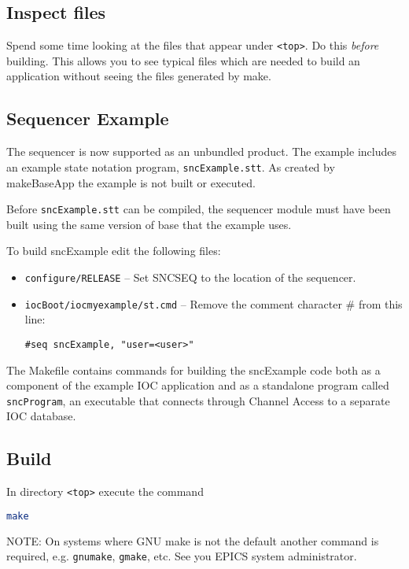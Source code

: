 \subsection{Inspect files}

Spend some time looking at the files that appear under \verb|<top>|. Do this \emph{before} building. This allows you to see typical 
files which are needed to build an application without seeing the files generated by make.

\subsection{Sequencer Example}

The sequencer is now supported as an unbundled product. The example includes an example state notation program,
\verb|sncExample.stt|. As created by makeBaseApp the example is not built or executed.

Before \verb|sncExample.stt| can be compiled, the sequencer module must have been built using the same version of base that the example uses.

To build sncExample edit the following files:

\begin{itemize}
\item \verb|configure/RELEASE| -- Set SNCSEQ to the location of the sequencer.
\item \verb|iocBoot/iocmyexample/st.cmd| -- Remove the comment character \# from this line:

\verb|#seq sncExample, "user=<user>"|
\end{itemize}

The Makefile contains commands for building the sncExample code both as a component of the example IOC application
and as a standalone program called \verb|sncProgram|, an executable that connects through Channel Access to a separate IOC database.

\subsection{Build}

In directory \verb|<top>| execute the command

\begin{lstlisting}[language=sh]
make
\end{lstlisting}

NOTE: On systems where GNU make is not the default another command is required, e.g. \verb|gnumake|, \verb|gmake|, etc. See 
you EPICS system administrator.

